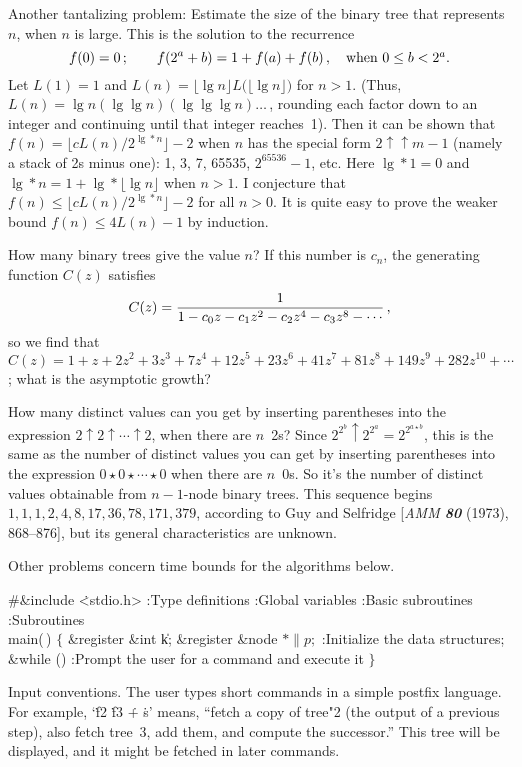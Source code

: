 Another tantalizing problem: Estimate the size of the binary tree that
represents $n$, when $n$ is large. This is the solution to the recurrence
$$f(0)=0\,;\qquad f(2^a+b)=1+f(a)+f(b)\,,\quad\hbox{when $0\le b<2^a$}.$$
Let $L(1)=1$ and $L(n)=\lfloor\lg n\rfloor L\bigl(\lfloor\lg n\rfloor\bigr)$
for $n>1$. (Thus, $L(n)=\lg n(\lg\lg n)(\lg\lg\lg n)\ldots\,$, rounding
each factor down to an integer and continuing until that integer reaches~1).
Then it can be shown that $f(n)=\lfloor cL(n)/2^{\lg*n}\rfloor-2$ when
$n$ has the special form $2\uparrow\uparrow m-1$ (namely a stack of 2s
minus one): 1, 3, 7, 65535, $2^{65536}-1$, etc. Here $\lg*1=0$ and
$\lg*n=1+\lg*\lfloor\lg n\rfloor$ when $n>1$. I conjecture that
$f(n)\le\lfloor cL(n)/2^{\lg*n}\rfloor-2$ for all $n>0$. It is quite easy
to prove the weaker bound $f(n)\le4L(n)-1$ by induction.

How many binary trees give the value $n$? If this number is $c_n$, the
generating function $C(z)$ satisfies
$$C(z)={1\over1-c_0z-c_1z^2-c_2z^4-c_3z^8-\cdots}\,,$$
so we find that $C(z)=1+z+2z^2+3z^3+7z^4+12z^5+23z^6+41z^7+81z^8+149z^9
+282z^{10}+\cdots\,$; what is the asymptotic growth?

How many distinct values can you get by inserting parentheses into
the expression $2\uparrow2\uparrow\cdots\uparrow2$, when there are $n$~2s?
Since $2^{2^b}\uparrow2^{2^a}=2^{2^{a\star b}}$, this is the same as the
number of distinct values you can get by inserting parentheses into
the expression $0\star0\star\cdots\star0$ when there are $n$~0s. So it's
the number of distinct values obtainable from $n-1$-node binary trees.
This sequence begins $1,1,1,2,4,8,17,36,78,171,379$, according to
Guy and Selfridge [{\sl AMM\/ \bf80} (1973), 868--876], but its general
characteristics are unknown.

Other problems concern time bounds for the algorithms below.

\Y\B\8\#\&{include} \.{<stdio.h>}\7
:Type definitions\X\6
:Global variables\X\6
:Basic subroutines\X\6
:Subroutines\X\7
\\{main}(\,)\1\1\2\2\6
${}\{{}$\1\6
\&{register} \&{int} \|k;\6
\&{register} \&{node} ${}{*}\|p;{}$\7
:Initialize the data structures\X;\6
\&{while} ()\1\5
:Prompt the user for a command and execute it\X\2\6
\4${}\}{}$\2\par
\fi

Input conventions. The user types short commands in a simple postfix
language. For example, `\.{f2} \.{f3} \.+ \.s' means, ``fetch a copy of
tree"2 (the output of a previous step), also fetch tree~3,
add them, and compute the successor.''
This tree will be displayed, and it might be fetched in later commands.

